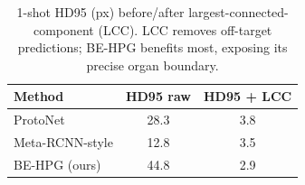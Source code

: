 \begin{table}[t]
\centering
\caption{1-shot HD95 (px) before/after largest-connected-component (LCC). LCC removes off-target predictions; BE-HPG benefits most, exposing its precise organ boundary.}
\label{tab:rawlcc}
\begin{tabular}{lcc}
\toprule
Method & HD95 raw & HD95 + LCC \\
\midrule
ProtoNet & 28.3 & 3.8 \\
Meta-RCNN-style & 12.8 & 3.5 \\
BE-HPG (ours) & 44.8 & 2.9 \\
\bottomrule
\end{tabular}
\end{table}
